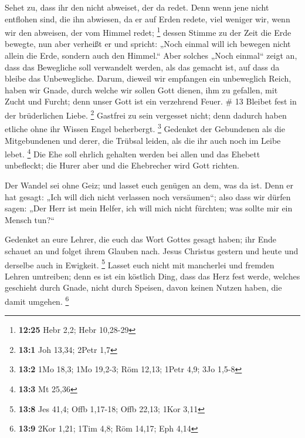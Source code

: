  Sehet zu, dass ihr den nicht abweiset, der da redet.
Denn wenn jene nicht entflohen sind, die ihn abwiesen, da er auf Erden
redete, viel weniger wir, wenn wir den abweisen, der vom Himmel redet;
\footnote{\textbf{12:25} Hebr 2,2; Hebr 10,28-29}  dessen
Stimme zu der Zeit die Erde bewegte, nun aber verheißt er und spricht:
„Noch einmal will ich bewegen nicht allein die Erde, sondern auch den
Himmel.``  Aber solches „Noch einmal`` zeigt an, dass das
Bewegliche soll verwandelt werden, als das gemacht ist, auf dass da
bleibe das Unbewegliche.  Darum, dieweil wir empfangen
ein unbeweglich Reich, haben wir Gnade, durch welche wir sollen Gott
dienen, ihm zu gefallen, mit Zucht und Furcht;  denn
unser Gott ist ein verzehrend Feuer. \# 13  Bleibet fest
in der brüderlichen Liebe. \footnote{\textbf{13:1} Joh 13,34; 2Petr 1,7}
 Gastfrei zu sein vergesset nicht; denn dadurch haben
etliche ohne ihr Wissen Engel beherbergt. \footnote{\textbf{13:2} 1Mo
  18,3; 1Mo 19,2-3; Röm 12,13; 1Petr 4,9; 3Jo 1,5-8} 
Gedenket der Gebundenen als die Mitgebundenen und derer, die Trübsal
leiden, als die ihr auch noch im Leibe lebet. \footnote{\textbf{13:3} Mt
  25,36}  Die Ehe soll ehrlich gehalten werden bei allen
und das Ehebett unbefleckt; die Hurer aber und die Ehebrecher wird Gott
richten.

 Der Wandel sei ohne Geiz; und lasset euch genügen an dem,
was da ist. Denn er hat gesagt: „Ich will dich nicht verlassen noch
versäumen``;  also dass wir dürfen sagen: „Der Herr ist
mein Helfer, ich will mich nicht fürchten; was sollte mir ein Mensch
tun?{}``

 Gedenket an eure Lehrer, die euch das Wort Gottes gesagt
haben; ihr Ende schauet an und folget ihrem Glauben nach. 
Jesus Christus gestern und heute und derselbe auch in Ewigkeit.
\footnote{\textbf{13:8} Jes 41,4; Offb 1,17-18; Offb 22,13; 1Kor 3,11}
 Lasset euch nicht mit mancherlei und fremden Lehren
umtreiben; denn es ist ein köstlich Ding, dass das Herz fest werde,
welches geschieht durch Gnade, nicht durch Speisen, davon keinen Nutzen
haben, die damit umgehen. \footnote{\textbf{13:9} 2Kor 1,21; 1Tim 4,8;
  Röm 14,17; Eph 4,14}

